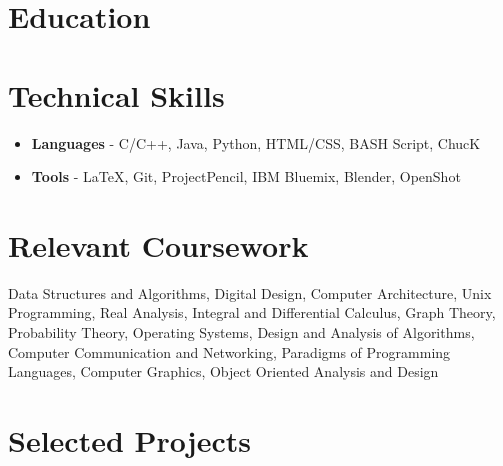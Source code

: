 \documentclass[11pt,a4paper,roman]{moderncv}        %
\title{}                               %
\begin{document}
\makecvtitle

\footnotesize{\section{\small{Education}}}


\section{\small{Technical Skills}}
\begin{itemize}
\item{\textbf{Languages} - C/C++, Java, Python, HTML/CSS, BASH Script, ChucK}
\item{\textbf{Tools} - \LaTeX , Git, ProjectPencil, IBM Bluemix, Blender, OpenShot}
\end{itemize}

\section{\small{Relevant Coursework}}

Data Structures and Algorithms, Digital Design, Computer Architecture, Unix Programming, Real Analysis, Integral and Differential Calculus, Graph Theory, Probability Theory, Operating Systems, Design and Analysis of Algorithms, Computer Communication and Networking, Paradigms of Programming Languages, Computer Graphics, Object Oriented Analysis and Design

\section{\small{Selected Projects}}
\end{document}
